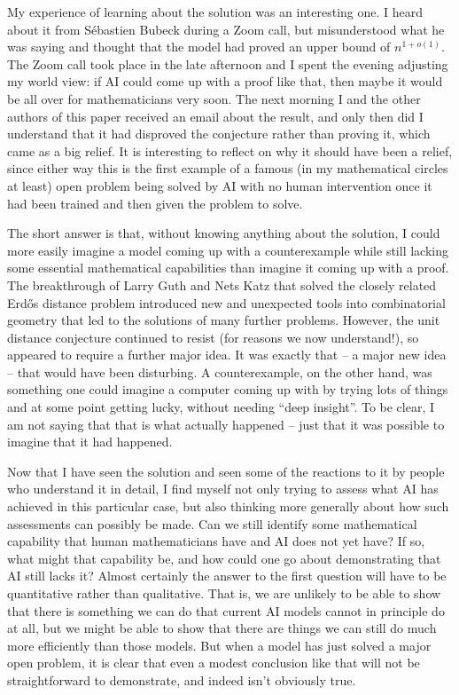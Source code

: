 \documentclass[11pt,reqno]{amsart}
\numberwithin{equation}{section}
\theoremstyle{definition}
\theoremstyle{remark}
\begin{document}
My experience of learning about the solution was an interesting one. I heard about it from S\'ebastien Bubeck during a Zoom call, but misunderstood what he was saying and thought that the model had proved an upper bound of $n^{1+o(1)}$. The Zoom call took place in the late afternoon and I spent the evening adjusting my world view: if AI could come up with a proof like that, then maybe it would be all over for mathematicians very soon. The next morning I and the other authors of this paper received an email about the result, and only then did I understand that it had disproved the conjecture rather than proving it, which came as a big relief. It is interesting to reflect on why it should have been a relief, since either way this is the first example of a famous (in my mathematical circles at least) open problem being solved by AI with no human intervention once it had been trained and then given the problem to solve.

The short answer is that, without knowing anything about the solution, I could more easily imagine a model coming up with a counterexample while still lacking some essential mathematical capabilities than imagine it coming up with a proof. The breakthrough of Larry Guth and Nets Katz that solved the closely related Erd\H os distance problem introduced new and unexpected tools into combinatorial geometry that led to the solutions of many further problems. However, the unit distance conjecture continued to resist (for reasons we now understand!), so appeared to require a further major idea. It was exactly that -- a major new idea -- that would have been disturbing. A counterexample, on the other hand, was something one could imagine a computer coming up with by trying lots of things and at some point getting lucky, without needing ``deep insight''. To be clear, I am not saying that that is what actually happened -- just that it was possible to imagine that it had happened. 

Now that I have seen the solution and seen some of the reactions to it by people who understand it in detail, I find myself not only trying to assess what AI has achieved in this particular case, but also thinking more generally about how such assessments can possibly be made. Can we still identify some mathematical capability that human mathematicians have and AI does not yet have? If so, what might that capability be, and how could one go about demonstrating that AI still lacks it? Almost certainly the answer to the first question will have to be quantitative rather than qualitative. That is, we are unlikely to be able to show that there is something we can do that current AI models cannot in principle do at all, but we might be able to show that there are things we can still do much more efficiently than those models. But when a model has just solved a major open problem, it is clear that even a modest conclusion like that will not be straightforward to demonstrate, and indeed isn't obviously true. 
\end{document}
